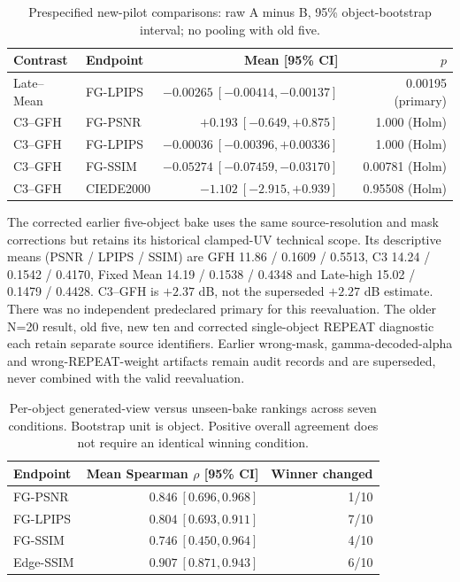 \documentclass[11pt]{article}
\begin{document}
\begin{table}[ht]\centering\scriptsize
\caption{Prespecified new-pilot comparisons: raw A minus B, 95\% object-bootstrap interval; no pooling with old five.}\label{tab:bake-paired}
\begin{tabular}{llrr}
\toprule Contrast & Endpoint & Mean [95\% CI] & $p$ \\
\midrule
Late--Mean & FG-LPIPS & $-0.00265\ [-0.00414,-0.00137]$ & 0.00195 (primary) \\
C3--GFH & FG-PSNR & $+0.193\ [-0.649,+0.875]$ & 1.000 (Holm) \\
C3--GFH & FG-LPIPS & $-0.00036\ [-0.00396,+0.00336]$ & 1.000 (Holm) \\
C3--GFH & FG-SSIM & $-0.05274\ [-0.07459,-0.03170]$ & 0.00781 (Holm) \\
C3--GFH & CIEDE2000 & $-1.102\ [-2.915,+0.939]$ & 0.95508 (Holm) \\
\bottomrule\end{tabular}\end{table}

The corrected earlier five-object bake uses the same source-resolution and mask corrections but retains its historical clamped-UV technical scope. Its descriptive means (PSNR / LPIPS / SSIM) are GFH 11.86 / 0.1609 / 0.5513, C3 14.24 / 0.1542 / 0.4170, Fixed Mean 14.19 / 0.1538 / 0.4348 and Late-high 15.02 / 0.1479 / 0.4428. C3--GFH is $+2.37$ dB, not the superseded $+2.27$ dB estimate. There was no independent predeclared primary for this reevaluation. The older N=20 result, old five, new ten and corrected single-object REPEAT diagnostic each retain separate source identifiers. Earlier wrong-mask, gamma-decoded-alpha and wrong-REPEAT-weight artifacts remain audit records and are superseded, never combined with the valid reevaluation.

\begin{table}[ht]\centering\scriptsize
\caption{Per-object generated-view versus unseen-bake rankings across seven conditions. Bootstrap unit is object. Positive overall agreement does not require an identical winning condition.}
\begin{tabular}{lrr}
\toprule Endpoint & Mean Spearman $\rho$ [95\% CI] & Winner changed \\
\midrule
FG-PSNR & $0.846\ [0.696,0.968]$ & 1/10 \\
FG-LPIPS & $0.804\ [0.693,0.911]$ & 7/10 \\
FG-SSIM & $0.746\ [0.450,0.964]$ & 4/10 \\
Edge-SSIM & $0.907\ [0.871,0.943]$ & 6/10 \\
\bottomrule\end{tabular}\end{table}
\end{document}
